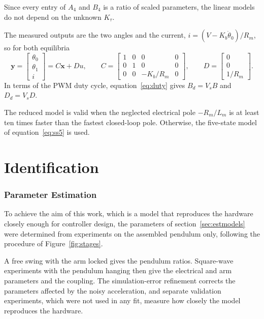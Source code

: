 \documentclass[a4paper,11pt]{article}
\begin{document}
Since every entry of $A_4$ and $B_4$ is a ratio of scaled parameters, the linear models do not depend on the unknown $K_\tau$.

The measured outputs are the two angles and the current, $i = (V - K_b \dot\theta_0)/R_m$, so for both equilibria
\begin{equation}
  \mathbf{y} = \begin{bmatrix} \theta_0 \\ \theta_1 \\ i \end{bmatrix} = C \mathbf{x} + D u, \qquad
  C = \begin{bmatrix} 1 & 0 & 0 & 0 \\ 0 & 1 & 0 & 0 \\ 0 & 0 & -K_b/R_m & 0 \end{bmatrix}, \qquad
  D = \begin{bmatrix} 0 \\ 0 \\ 1/R_m \end{bmatrix}.
  \label{eq:outputs}
\end{equation}
In terms of the PWM duty cycle, equation~\ref{eq:duty} gives $B_d = V_s B$ and $D_d = V_s D$.

The reduced model is valid when the neglected electrical pole $-R_m/L_m$ is at least ten times faster than the fastest closed-loop pole. Otherwise, the five-state model of equation~\ref{eq:ss5} is used.

\part{Identification}

\section{Parameter Estimation}
\label{sec:estimation}
To achieve the aim of this work, which is a model that reproduces the hardware closely enough for controller design, the parameters of section~\ref{sec:estmodels} were determined from experiments on the assembled pendulum only, following the procedure of Figure~\ref{fig:stages}.

A free swing with the arm locked gives the pendulum ratios. Square-wave experiments with the pendulum hanging then give the electrical and arm parameters and the coupling. The simulation-error refinement corrects the parameters affected by the noisy acceleration, and separate validation experiments, which were not used in any fit, measure how closely the model reproduces the hardware.
\end{document}
